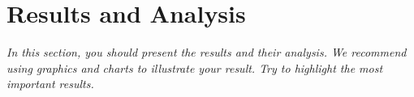 \chapter{Results and Analysis}
\label{ch:resultsandanalysis}

\emph{In this section, you should present the results and their analysis. We recommend using graphics and charts to illustrate your result. Try to highlight the most important results.}